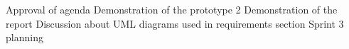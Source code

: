 \nextItem Approval of agenda
\nextItem Demonstration of the prototype 2
\nextItem Demonstration of the report
\nextItem Discussion about UML diagrams used in requirements section
\nextItem Sprint 3 planning


